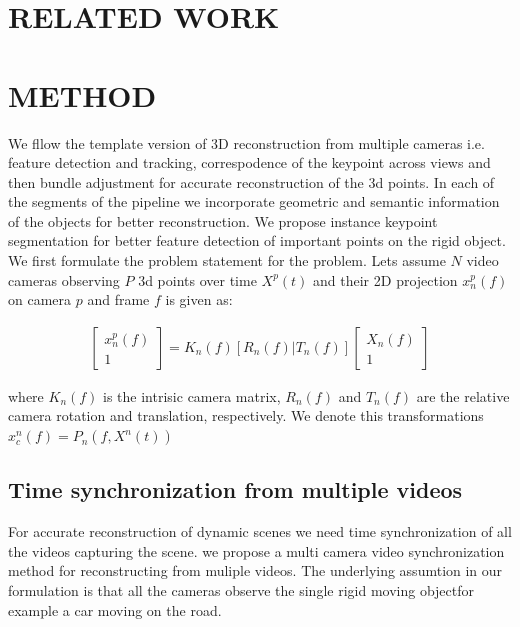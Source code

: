 \documentclass[10pt,twocolumn,letterpaper]{article}
\begin{document}
\section{RELATED WORK}
\subsection{}
\section{METHOD}
We fllow the template version of 3D reconstruction from multiple cameras i.e. feature detection and tracking, correspodence of the keypoint across views and then bundle adjustment for accurate reconstruction of the 3d points. In each of the segments of the pipeline we incorporate geometric and semantic information of the objects for better reconstruction. We propose instance keypoint segmentation for better feature detection of important points on the rigid object. 
We first formulate the problem statement for the problem. Lets assume $N$ video cameras observing $P$ 3d points over time $X^p(t)$ and their 2D projection $x^p_n(f)$ on camera $p$ and frame $f$ is given as:

\begin{align*}
 \begin{bmatrix} x_n^p(f) \\ 1  \end{bmatrix} = K_n(f)[R_n(f) | T_n(f)] \begin{bmatrix} X_n(f) \\ 1  \end{bmatrix}
\end{align*} 

where $K_n(f)$ is the intrisic camera matrix, $R_n(f)$ and $T_n(f)$ are the relative camera rotation and translation, respectively. We denote this transformations $x_c^n(f) = P_n(f,X^n(t))$

\subsection{Time synchronization from multiple videos}
For accurate reconstruction of dynamic scenes we need time synchronization of all the videos capturing the scene. we propose a multi camera video synchronization method for reconstructing from muliple videos. The underlying assumtion in our formulation is that all the cameras observe the single rigid moving objectfor example a car moving on the road. 
\end{document}
